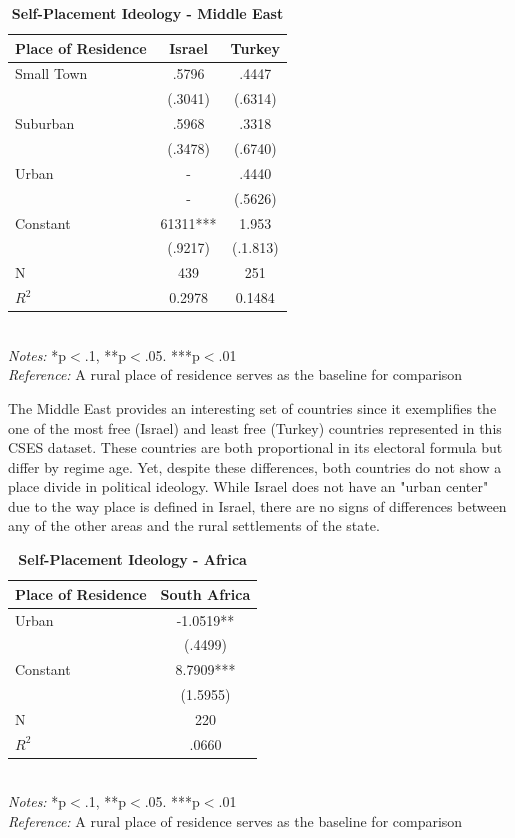 \documentclass[12pt, titlepage]{article}
\newcommand\e{\emph}
\newcommand\tb{\textbf}
\begin{document}
\begin{singlespace}
	\begin{table}[H]
		\centering
		\caption{\tb{Self-Placement Ideology - Middle East}}
		\begin{tabulary}{\linewidth}{l c c}
			\\
			\hline
			\tb{Place of Residence}&\tb{Israel} & \tb{Turkey} \\
			\hline
			Small Town&.5796 & .4447 \\
			&(.3041)  & (.6314)\\
			Suburban&.5968 &.3318 \\
			& (.3478)  & (.6740)\\
			Urban &- & .4440\\
			&- & (.5626)\\
			Constant& 61311*** &1.953 \\
			& (.9217)  & (.1.813)\\
			N&439 & 251\\
			$R^2$&0.2978 & 0.1484 \\
			\hline 
		\end{tabulary}
		\\
		\e{Notes:} *p$<$.1, **p$<$.05. ***p$<$.01 \\
		\e{Reference:} A rural place of residence serves as the baseline for comparison
		\label{table10}
	\end{table}
\end{singlespace}

The Middle East provides an interesting set of countries since it exemplifies the one of the most free (Israel) and least free (Turkey) countries represented in this CSES dataset. These countries are both proportional in its electoral formula but differ by regime age. Yet, despite these differences, both countries do not show a place divide in political ideology. While Israel does not have an "urban center" due to the way place is defined in Israel, there are no signs of differences between any of the other areas and the rural settlements of the state.

\begin{singlespace}
	\begin{table}[H]
		\centering
		\caption{\tb{Self-Placement Ideology - Africa}}
		\begin{tabulary}{\linewidth}{l c}
			\\
			\hline
			\tb{Place of Residence}& \tb{South Africa} \\
			\hline
			Urban&-1.0519** \\
			&(.4499)\\
			Constant&8.7909*** \\
			& (1.5955) \\
			N& 220\\
			$R^2$&.0660 \\
			\hline
		\end{tabulary}
		\\
		\e{Notes:} *p$<$.1, **p$<$.05. ***p$<$.01 \\
		\e{Reference:} A rural place of residence serves as the baseline for comparison
		\label{table11}
	\end{table}
\end{singlespace}
\end{document}
